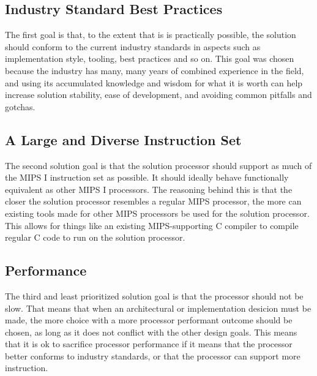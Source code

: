 \subsection{Industry Standard Best Practices}

The first goal is that, to the extent that is is practically possible, the solution should conform to the current industry standards in aspects such as implementation style, tooling, best practices and so on.
This goal was chosen because the industry has many, many years of combined experience in the field, and using its accumulated knowledge and wisdom for what it is worth can help increase solution stability, ease of development, and avoiding common pitfalls and gotchas.

\subsection{A Large and Diverse Instruction Set}

The second solution goal is that the solution processor should support as much of the MIPS I instruction set as possible.
It should ideally behave functionally equivalent as other MIPS I processors.
The reasoning behind this is that the closer the solution processor resembles a regular MIPS processor, the more can existing tools made for other MIPS processors be used for the solution processor.
This allows for things like an existing MIPS-supporting C compiler to compile regular C code to run on the solution processor.

\subsection{Performance}

The third and least prioritized solution goal is that the processor should not be slow.
That means that when an architectural or implementation desicion must be made, the more choice with a more processor performant outcome should be chosen, as long as it does not conflict with the other design goals.
This means that it is ok to sacrifice processor performance if it means that the processor better conforms to industry standards, or that the processor can support more instruction.
